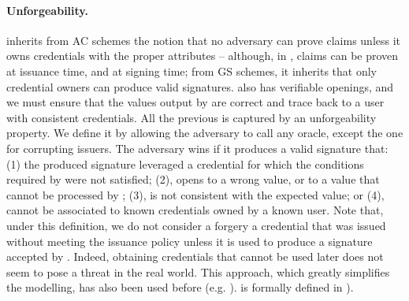 \paragraph{Unforgeability.} \UAS inherits from AC schemes the notion that no
adversary can prove claims unless it owns credentials with the proper
attributes -- although, in \UAS, claims can be proven at issuance time, and
at signing time; from GS schemes, it inherits that only credential owners can
produce valid signatures. \UAS also has verifiable openings, and we must ensure
that the values output by \Open are correct and trace back to a user with
consistent credentials. All the previous is captured by an unforgeability
property. We define it by allowing the adversary to call any oracle, except the
one for corrupting issuers. The adversary wins if it produces a valid signature
that:  (1) the produced signature leveraged a credential for
which the conditions required by \fissue were not satisfied; (2), opens to a
wrong value, or to a value that cannot be processed by \Judge; (3), is not
consistent with the expected \Yeval value; or (4), cannot be associated to
known credentials owned by a known user.
%
Note that, under this definition, we do not consider a forgery a credential that
was issued without meeting the issuance policy unless it is used to produce
a signature accepted by \Verify. Indeed, obtaining credentials that cannot be
used later does not seem to pose a threat in the real world. This approach,
which greatly simplifies the modelling, has also been used before (e.g.
\cite{ckl+15}).
%
\ExpForge is formally defined in ).

